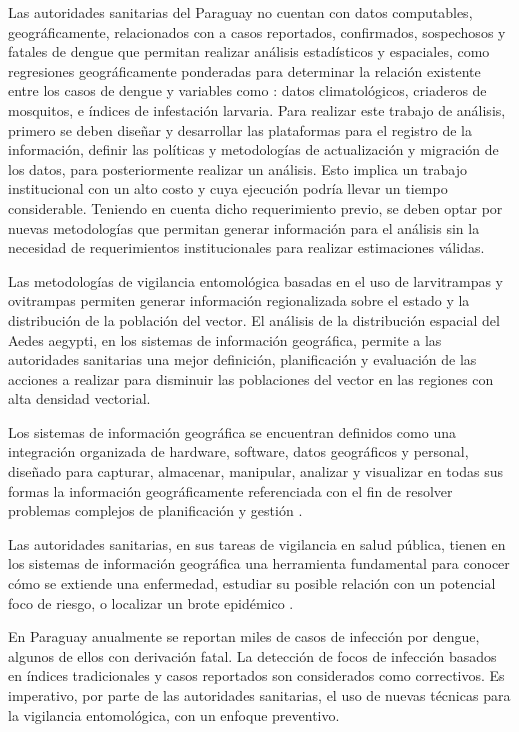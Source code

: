 Las autoridades sanitarias del Paraguay no cuentan con datos computables, geográficamente,
relacionados con a casos reportados, confirmados, sospechosos y fatales de dengue que permitan
realizar análisis estadísticos y espaciales, como regresiones geográficamente ponderadas para
determinar la relación existente entre los casos de dengue y variables como : datos
climatológicos, criaderos de mosquitos, e índices de infestación larvaria. Para realizar este
trabajo de análisis, primero se deben diseñar y desarrollar las plataformas para el registro de la
información, definir las políticas y metodologías de actualización y migración de los
datos, para posteriormente realizar un análisis. Esto implica un trabajo institucional con un
alto costo y cuya ejecución podría llevar un tiempo considerable. Teniendo en cuenta dicho
requerimiento previo, se deben optar por nuevas metodologías que permitan generar información para
el análisis sin la necesidad de requerimientos institucionales para realizar estimaciones válidas.

Las metodologías de vigilancia entomológica basadas en el uso de larvitrampas y ovitrampas
permiten generar información regionalizada sobre el estado y la distribución de la población del
vector. El análisis de la distribución espacial del Aedes aegypti, en los sistemas de información
geográfica, permite a las autoridades sanitarias una mejor definición, planificación y evaluación
de las acciones a realizar para disminuir las poblaciones del vector en las regiones con alta
densidad vectorial.

Los sistemas de información geográfica se encuentran definidos como una integración organizada de
hardware, software, datos geográficos y personal, diseñado para capturar, almacenar, manipular,
analizar y visualizar en todas sus formas la información geográficamente referenciada con el fin
de resolver problemas complejos de planificación y gestión \citep{lopezMarcos2007}.

Las autoridades sanitarias, en sus tareas de vigilancia en salud pública, tienen en los sistemas
de información geográfica una herramienta fundamental para conocer cómo se extiende una
enfermedad, estudiar su posible relación con un potencial foco de riesgo, o localizar un brote
epidémico \cite{vgomesAegis2001}.

En Paraguay anualmente se reportan miles de casos de infección por dengue, algunos de ellos con
derivación fatal. La detección de focos de infección basados en índices tradicionales y casos
reportados son considerados como correctivos. Es imperativo, por parte de las autoridades
sanitarias, el uso de nuevas técnicas para la vigilancia entomológica, con un enfoque preventivo.

